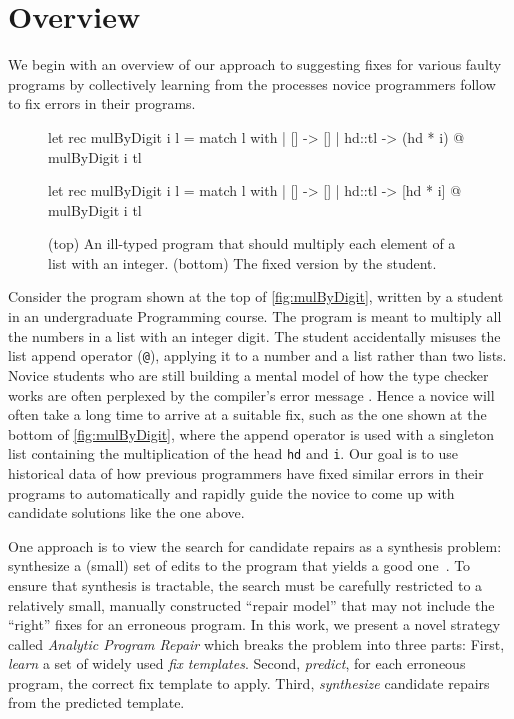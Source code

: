 \section{Overview}
\label{sec:overview}

We begin with an overview of our approach to suggesting fixes for various faulty
programs by collectively learning from the processes novice programmers follow
to fix errors in their programs.

\begin{figure}[ht]
\begin{ecode}
let rec mulByDigit i l =
  match l with
  | []     -> []
  | hd::tl -> (hd * i) @ mulByDigit i tl
\end{ecode}

\begin{ecode}
let rec mulByDigit i l =
  match l with
  | []     -> []
  | hd::tl -> [hd * i] @ mulByDigit i tl
\end{ecode}
\caption{(top) An ill-typed \ocaml program that should multiply each element
of a list with an integer. (bottom) The fixed version by the student.}
\label{fig:mulByDigit}
\end{figure}


 Consider the program \mbd shown at the top of
\autoref{fig:mulByDigit}, written by a student in an undergraduate Programming
course. The program is meant to multiply all the numbers in a list with an
integer digit. The student accidentally misuses the list append operator
(\texttt{@}), applying it to a number and a list rather than two lists.
%
Novice students who are still building a mental model of how the type checker
works are often perplexed by the compiler's error message \cite{fixme}. Hence a
novice will often take a long time to arrive at a suitable fix, such as the one
shown at the bottom of \autoref{fig:mulByDigit}, where the append operator is
used with a singleton list containing the multiplication of the
head \texttt{hd} and \texttt{i}.
%
Our goal is to use historical data of how previous programmers have fixed
similar errors in their programs to automatically and rapidly guide the novice
to come up with candidate solutions like the one above.


%
One approach is to view the search for candidate repairs as a synthesis problem:
synthesize a (small) set of edits to the program that yields a good 
one~\cite{singh2013, fixme}.
%
To ensure that synthesis is tractable, the search must be carefully restricted
to a relatively small, manually constructed ``repair model'' that may not
include the ``right'' fixes for an erroneous program.
%
In this work, we present a novel strategy called \emph{Analytic Program
Repair} which breaks the problem into three parts:
%
First, \emph{learn} a set of widely used \emph{fix templates}.
%
Second, \emph{predict}, for each erroneous program, the correct fix template
to apply.
%
Third, \emph{synthesize} candidate repairs from the predicted template.

